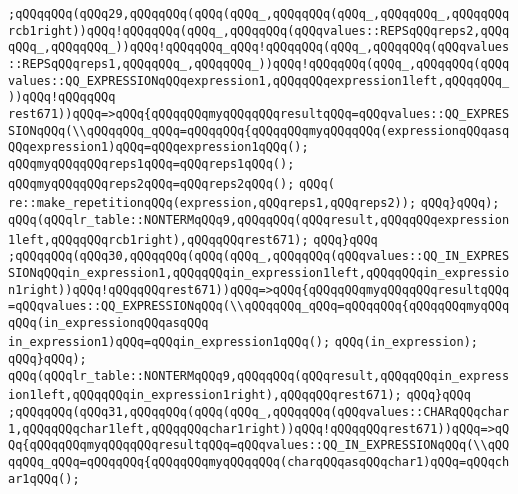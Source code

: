 \verb|;qQQqqQQq(qQQq29,qQQqqQQq(qQQq(qQQq_,qQQqqQQq(qQQq_,qQQqqQQq_,qQQqqQQqrcb1right))qQQq!qQQqqQQq(qQQq_,qQQqqQQq(qQQqvalues::REPSqQQqreps2,qQQqqQQq_,qQQqqQQq_))qQQq!qQQqqQQq_qQQq!qQQqqQQq(qQQq_,qQQqqQQq(qQQqvalues::REPSqQQqreps1,qQQqqQQq_,qQQqqQQq_))qQQq!qQQqqQQq(qQQq_,qQQqqQQq(qQQqvalues::QQ_EXPRESSIONqQQqexpression1,qQQqqQQqexpression1left,qQQqqQQq_))qQQq!qQQqqQQq|\newline
\verb|rest671))qQQq=>qQQq{qQQqqQQqmyqQQqqQQqresultqQQq=qQQqvalues::QQ_EXPRESSIONqQQq(\\qQQqqQQq_qQQq=qQQqqQQq{qQQqqQQqmyqQQqqQQq(expressionqQQqasqQQqexpression1)qQQq=qQQqexpression1qQQq();|\newline
\verb|qQQqmyqQQqqQQqreps1qQQq=qQQqreps1qQQq();|\newline
\verb|qQQqmyqQQqqQQqreps2qQQq=qQQqreps2qQQq();|\newline
\verb|qQQq(|\newline
\verb|re::make_repetitionqQQq(expression,qQQqreps1,qQQqreps2));|\newline
\verb|qQQq}qQQq);|\newline
\verb|qQQq(qQQqlr_table::NONTERMqQQq9,qQQqqQQq(qQQqresult,qQQqqQQqexpression1left,qQQqqQQqrcb1right),qQQqqQQqrest671);|\newline
\verb|qQQq}qQQq|\newline
\verb|;qQQqqQQq(qQQq30,qQQqqQQq(qQQq(qQQq_,qQQqqQQq(qQQqvalues::QQ_IN_EXPRESSIONqQQqin_expression1,qQQqqQQqin_expression1left,qQQqqQQqin_expression1right))qQQq!qQQqqQQqrest671))qQQq=>qQQq{qQQqqQQqmyqQQqqQQqresultqQQq=qQQqvalues::QQ_EXPRESSIONqQQq(\\qQQqqQQq_qQQq=qQQqqQQq{qQQqqQQqmyqQQqqQQq(in_expressionqQQqasqQQq|\newline
\verb|in_expression1)qQQq=qQQqin_expression1qQQq();|\newline
\verb|qQQq(in_expression);|\newline
\verb|qQQq}qQQq);|\newline
\verb|qQQq(qQQqlr_table::NONTERMqQQq9,qQQqqQQq(qQQqresult,qQQqqQQqin_expression1left,qQQqqQQqin_expression1right),qQQqqQQqrest671);|\newline
\verb|qQQq}qQQq|\newline
\verb|;qQQqqQQq(qQQq31,qQQqqQQq(qQQq(qQQq_,qQQqqQQq(qQQqvalues::CHARqQQqchar1,qQQqqQQqchar1left,qQQqqQQqchar1right))qQQq!qQQqqQQqrest671))qQQq=>qQQq{qQQqqQQqmyqQQqqQQqresultqQQq=qQQqvalues::QQ_IN_EXPRESSIONqQQq(\\qQQqqQQq_qQQq=qQQqqQQq{qQQqqQQqmyqQQqqQQq(charqQQqasqQQqchar1)qQQq=qQQqchar1qQQq();|\newline
